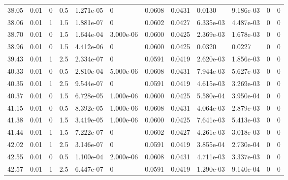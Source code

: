 \documentclass[preview]{standalone}
\begin{document}
{{{\begin{tabular}{L{1.2cm}C{1.2cm} C{0.3cm}C{0.5cm} C{1.4cm}C{1.4cm} C{1.4cm}C{1.4cm} C{1.6cm}C{1.6cm} C{1.6cm}C{1.6cm}}
  38.05  &  0.01  & 0     & 0.5 &  1.271e-05  & 0  &  0.0608&   0.0431& 0.0130 & 9.186e-03   &  0 & 0  \\ 
  38.06  &  0.01  & 1     & 1.5 &  1.881e-07  & 0  &  0.0602&   0.0427& 6.335e-03 & 4.487e-03   &  0 & 0  \\ 
  38.70  &  0.01  & 0     & 1.5 &  1.644e-04  & 3.000e-06  &  0.0600&   0.0425& 2.369e-03 & 1.678e-03   &  0 & 0  \\ 
  38.96  &  0.01  & 0     & 1.5 &  4.412e-06  & 0  &  0.0600&   0.0425& 0.0320 & 0.0227   &  0 & 0  \\ 
  39.43  &  0.01  & 1     & 2.5 &  2.334e-07  & 0  &  0.0591&   0.0419& 2.620e-03 & 1.856e-03   &  0 & 0  \\ 
  40.33  &  0.01  & 0     & 0.5 &  2.810e-04  & 5.000e-06  &  0.0608&   0.0431& 7.944e-03 & 5.627e-03   &  0 & 0  \\ 
  40.35  &  0.01  & 1     & 2.5 &  9.544e-07  & 0  &  0.0591&   0.0419& 4.615e-03 & 3.269e-03   &  0 & 0  \\ 
  40.37  &  0.01  & 0     & 1.5 &  6.728e-05  & 1.000e-06  &  0.0600&   0.0425& 5.580e-04 & 3.950e-04   &  0 & 0  \\ 
  41.15  &  0.01  & 0     & 0.5 &  8.392e-05  & 1.000e-06  &  0.0608&   0.0431& 4.064e-03 & 2.879e-03   &  0 & 0  \\ 
  41.38  &  0.01  & 0     & 1.5 &  3.419e-05  & 1.000e-06  &  0.0600&   0.0425& 7.641e-03 & 5.413e-03   &  0 & 0  \\ 
  41.44  &  0.01  & 1     & 1.5 &  7.222e-07  & 0  &  0.0602&   0.0427& 4.261e-03 & 3.018e-03   &  0 & 0  \\ 
  42.02  &  0.01  & 1     & 2.5 &  3.146e-07  & 0  &  0.0591&   0.0419& 3.855e-04 & 2.730e-04   &  0 & 0  \\ 
  42.55  &  0.01  & 0     & 0.5 &  1.100e-04  & 2.000e-06  &  0.0608&   0.0431& 4.711e-03 & 3.337e-03   &  0 & 0  \\ 
  42.57  &  0.01  & 1     & 2.5 &  6.447e-07  & 0  &  0.0591&   0.0419& 1.290e-03 & 9.140e-04   &  0 & 0  \\ 
\hline 
\end{tabular} 

}}}
\end{document}
